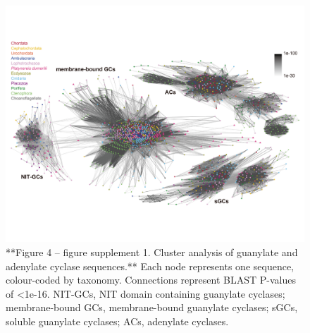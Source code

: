 \documentclass[
  10pt,
  onecolumn]{article}
\begin{document}
\begin{figure}
\includegraphics[width=33.33in]{figures/Fig4_sup1} \caption{**Figure 4 -- figure supplement 1. Cluster analysis of guanylate and adenylate cyclase sequences.** Each node represents one sequence, colour-coded by taxonomy. Connections represent BLAST P-values of <1e-16. NIT-GCs, NIT domain containing guanylate cyclases; membrane-bound GCs, membrane-bound guanylate cyclases; sGCs, soluble guanylate cyclases; ACs, adenylate cyclases.}\label{fig:unnamed-chunk-16}
\end{figure}
\end{document}
